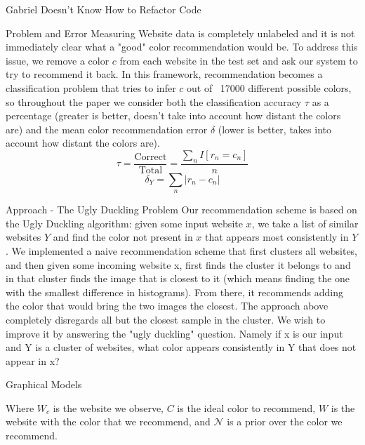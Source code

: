 \documentclass{beamer}
\newcommand{\N}{\mathcal{N}}
\begin{document}
\begin{frame}{\centerline{\Huge Gabriel Doesn't Know How to Refactor Code}}
\begin{textblock}{5}
\begin{block}{Problem and Error Measuring}
Website data is completely unlabeled and it is not immediately clear what a "good" color recommendation would be. To address this issue, we remove a color $c$ from each website in the test set and ask our system to try to recommend it back. In this framework, recommendation becomes a classification problem that tries to infer $c$ out of ~17000 different possible colors, so throughout the paper we consider both the classification accuracy $\tau$ as a percentage (greater is better, doesn't take into account how distant the colors are) and the mean color recommendation error $\delta$ (lower is better, takes into account how distant the colors are).
$$\tau = \frac{\text{Correct}}{\text{Total}} = \frac{\sum_n I[r_n = c_n]}{n}$$
$$\delta_Y = \sum_n |r_n - c_n|$$
\end{block}


\begin{block}{Approach - The Ugly Duckling Problem}
Our recommendation scheme is based on the Ugly Duckling algorithm: given some input website $x$, we take a list of similar websites $Y$ and find the color not present in $x$ that appears most consistently in $Y$.
We implemented a naive recommendation scheme that first clusters all websites, and then
given some incoming website x, first finds the cluster it belongs to and in that cluster finds the
image that is closest to it (which means finding the one with the smallest difference in
histograms). From there, it recommends adding the color that would bring the two images the
closest.
The approach above completely disregards all but the closest sample in the cluster. We wish to
improve it by answering the "ugly duckling" question. Namely if x is our input and Y is a cluster
of websites, what color appears consistently in Y that does not appear in x?
\end{block}

\begin{block}{Graphical Models}
\begin{figure}
\centering
{}
\end{figure}
Where $W_c$ is the website we observe, $C$ is the ideal color to recommend, $W$ is the website with the color that we recommend, and $\N$ is a prior over the color we recommend.
\end{block}



\end{textblock}
\end{frame}
\end{document}
